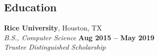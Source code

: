 \documentclass[margin,line]{resume}
\begin{document}
\begin{resume}
\vspace{1mm}

\section{\mysidestyle Education}

\textbf{Rice University}, Houston, TX \vspace{1mm}\\
\textsl{B.S., Computer Science} \hfill \textbf{Aug 2015 -- May 2019} \vspace{1mm}\\
\textsl{Trustee Distinguished Scholarship} 


\end{resume}
\end{document}
